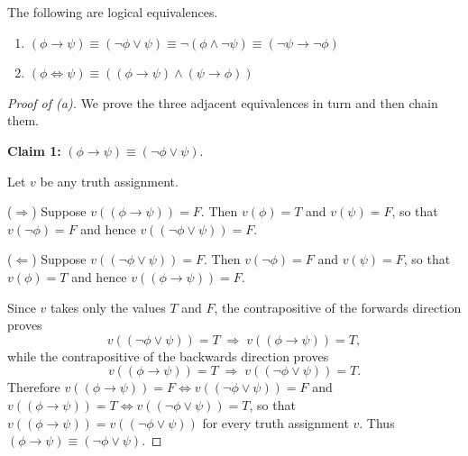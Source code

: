 \documentclass{article}
\theoremstyle{remark}\newtheorem{remark}{Remark}
\theoremstyle{plain}
\newenvironment{bookthm}[1]
  {\renewcommand\thebookthminner{#1}\bookthminner}
  {\endbookthminner}
\begin{document}
\begin{bookthm}{2.4}
    The following are logical equivalences.
    \begin{enumerate}[label=\textup{(\alph*)}]
    \item $(\phi \to \psi) \equiv (\neg\phi \lor \psi) \equiv \neg(\phi \land \neg\psi) \equiv (\neg\psi \to \neg\phi)$
    \item $(\phi \iff \psi) \equiv ((\phi \to \psi) \land (\psi \to \phi))$
    \end{enumerate}
\end{bookthm}

\begin{proof}[Proof of (a)]
    We prove the three adjacent equivalences in turn and then chain them.

    \medskip\noindent
    \textbf{Claim 1:} $(\phi \to \psi) \equiv (\neg\phi \lor \psi)$.

    \smallskip\noindent
    Let $v$ be any truth assignment.

    \smallskip\noindent
    ($\Rightarrow$)\enspace
    Suppose $v((\phi \to \psi)) = F$. Then $v(\phi) = T$ and $v(\psi) = F$,
    so that $v(\neg\phi) = F$ and hence $v((\neg\phi \lor \psi)) = F$.

    \smallskip\noindent
    ($\Leftarrow$)\enspace
    Suppose $v((\neg\phi \lor \psi)) = F$. Then $v(\neg\phi) = F$ and
    $v(\psi) = F$, so that $v(\phi) = T$ and hence $v((\phi \to \psi)) = F$.

    \smallskip
    Since $v$ takes only the values $T$ and $F$, the contrapositive of the
    forwards direction proves
    \[
        v((\neg\phi \lor \psi)) = T \;\Rightarrow\; v((\phi \to \psi)) = T,
    \]
    while the contrapositive of the backwards direction proves
    \[
        v((\phi \to \psi)) = T \;\Rightarrow\; v((\neg\phi \lor \psi)) = T.
    \]
    Therefore $v((\phi \to \psi)) = F \iff v((\neg\phi \lor \psi)) = F$ and
    $v((\phi \to \psi)) = T \iff v((\neg\phi \lor \psi)) = T$, so that
    $v((\phi \to \psi)) = v((\neg\phi \lor \psi))$ for every truth
    assignment $v$. Thus $(\phi \to \psi) \equiv (\neg\phi \lor \psi)$.




\end{proof}
\end{document}
